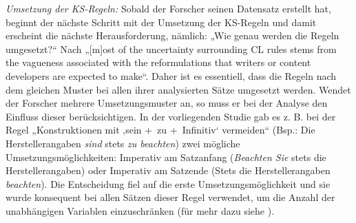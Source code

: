 \textit{Umsetzung der KS-Regeln:} Sobald der Forscher seinen Datensatz erstellt hat, beginnt der nächste Schritt mit der Umsetzung der KS-Regeln und damit erscheint die nächste Herausforderung, nämlich: „Wie genau werden die Regeln umgesetzt?“ Nach \citet[74]{Roturier2006} „[m]ost of the uncertainty surrounding CL rules stems from the vagueness associated with the reformulations that writers or content developers are expected to make“. Daher ist es essentiell, dass die Regeln nach dem gleichen Muster bei allen ihrer analysierten Sätze umgesetzt werden. Wendet der Forscher mehrere Umsetzungsmuster an, so muss er bei der Analyse den Einfluss dieser berücksichtigen. In der vorliegenden Studie gab es z. B. bei der Regel „Konstruktionen mit ‚sein +~zu +~Infinitiv‘ vermeiden“ (Bsp.: Die Herstellerangaben \textit{sind} stets \textit{zu beachten}) zwei mögliche Umsetzungsmöglichkeiten: Imperativ am Satzanfang (\textit{Beachten Sie} stets die Herstellerangaben) oder Imperativ am Satzende (Stets die Herstellerangaben \textit{beachten}). Die Entscheidung fiel auf die erste Umsetzungsmöglichkeit und sie wurde konsequent bei allen Sätzen dieser Regel verwendet, um die Anzahl der unabhängigen Variablen einzuschränken (für mehr dazu siehe ).

